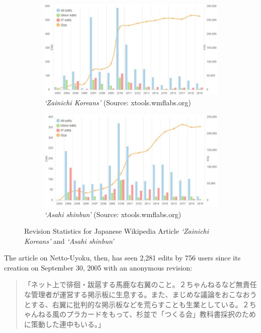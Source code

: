 \documentclass[10pt,british,A4paper,oneside]{memoir}
\begin{document}
\begin{figure}[!htb]
 \centering
 \begin{subfigure}[b]{0.49\textwidth}
 \includegraphics[width=\textwidth]{images/wiki/zainichi.jpg}
 \caption{\textit{`Zainichi Koreans'} (Source: xtools.wmflabs.org)}
 \label{fig:xtools-zainichi}
 \end{subfigure}
 \begin{subfigure}[b]{0.49\textwidth}
 \includegraphics[width=\textwidth]{images/wiki/asahi-shimbun.jpg}
 \caption{\textit{`Asahi shinbun'} (Source: xtools.wmflabs.org)}
 \label{fig:xtools-asahi}
 \end{subfigure}
 \caption{Revision Statistics for Japanese Wikipedia Article \textit{`Zainichi Koreans'} and \textit{`Asahi shinbun'}}\label{fig:xtools}
\end{figure}

The article on Netto-Uyoku, then, has seen 2,281 edits by 756 users since
its creation on September 30, 2005 with an anonymous revision:

\begin{quote}
「ネット上で徘徊・跋扈する馬鹿な右翼のこと。２ちゃんねるなど無責任な管理者が運営する掲示板に生息する。また、まじめな議論をおこなおうとする、右翼に批判的な掲示板などを荒らすことも生業としている。２ちゃんねる風のプラカードをもって、杉並で「つくる会」教科書採択のために策動した連中もいる。」
\end{quote}
\end{document}

